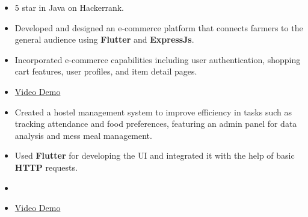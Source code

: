 \documentclass[10pt,a4paper,ragged2e,withhyper]{altacv}
\begin{document}
\begin{paracol}{2}
\begin{itemize}
\item 5 star in Java on Hackerrank.
\end{itemize}






\begin{itemize}
\item Developed and designed an e-commerce platform that connects farmers to the general audience using \textbf{\color{accent!90!black}Flutter} and \textbf{\color{accent!90!black}ExpressJs}.
\item Incorporated e-commerce capabilities including user authentication, shopping cart features, user profiles, and item detail pages.
\item \href{https://user-images.githubusercontent.com/71925269/227570845-4a7de5cd-c464-42b2-95cc-fb958e5d64a4.mp4}{Video Demo}
\end{itemize}
\divider

\begin{itemize}
\item Created a hostel management system to improve efficiency in tasks such as tracking attendance and food preferences, featuring an admin panel for data analysis and mess meal management.
\item Used \textbf{\color{accent!90!black}Flutter} for developing the UI and integrated it with the help of basic \textbf{\color{accent!90!black}HTTP} requests.
\item {}
\item \href{https://user-images.githubusercontent.com/71925269/227570923-6c04c0f0-38ef-41e8-8767-72a31ae21345.mp4}{Video Demo}
\end{itemize}
\divider


\end{paracol}
\end{document}
